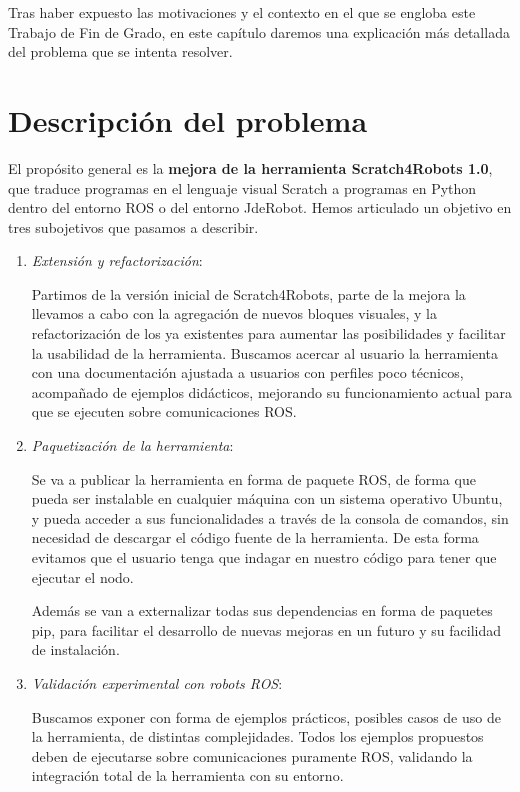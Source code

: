 Tras haber expuesto las motivaciones y el contexto en el que se engloba este Trabajo de Fin de Grado, en este capítulo daremos una explicación más detallada del problema que se intenta resolver.\\ 

\section{Descripción del problema}
\label{sec:descripcion del problema}
El propósito general es la \textbf{mejora de la herramienta Scratch4Robots 1.0}, que traduce programas en el lenguaje visual Scratch a programas en Python dentro del entorno ROS o del entorno JdeRobot. Hemos articulado un objetivo en tres subojetivos que pasamos a describir.
\begin{enumerate}
\item \textit{Extensión y refactorización}:

Partimos de la versión inicial de Scratch4Robots, parte de la mejora la llevamos a cabo con la agregación de nuevos bloques visuales, y la refactorización de los ya existentes para aumentar las posibilidades y facilitar la usabilidad de la herramienta. Buscamos acercar al usuario la herramienta con una documentación ajustada a usuarios con perfiles poco técnicos, acompañado de ejemplos didácticos, mejorando su funcionamiento actual para que se ejecuten sobre comunicaciones ROS.

\item \textit{Paquetización de la herramienta}:

Se va a publicar la herramienta en forma de paquete ROS, de forma que pueda ser instalable en cualquier máquina con un sistema operativo Ubuntu, y pueda acceder a sus funcionalidades a través de la consola de comandos, sin necesidad de descargar el código fuente de la herramienta. De esta forma evitamos que el usuario tenga que indagar en nuestro código para tener que ejecutar el nodo.

Además se van a externalizar todas sus dependencias en forma de paquetes pip, para facilitar el desarrollo de nuevas mejoras en un futuro y su facilidad de instalación.

\item \textit{Validación experimental con robots ROS}:

Buscamos exponer con forma de ejemplos prácticos, posibles casos de uso de la herramienta, de distintas complejidades. Todos los ejemplos propuestos deben de ejecutarse sobre comunicaciones puramente ROS, validando la integración total de la herramienta con su entorno.
\end{enumerate}


